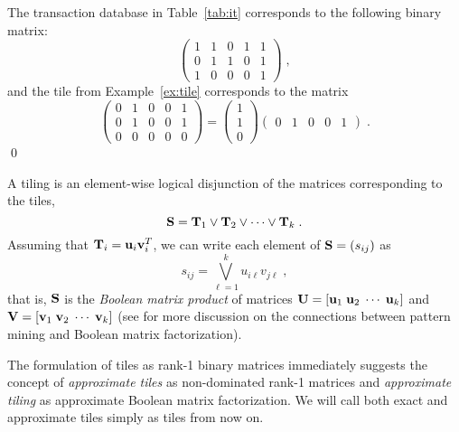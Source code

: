 \begin{example} The transaction database in Table~\ref{tab:it} corresponds to the following binary matrix:
\[
\begin{pmatrix}
    1  & 1 & 0 & 1 & 1 \\
    0  & 1 & 1 & 0 & 1 \\
    1  & 0 & 0 & 0 & 1  
\end{pmatrix}\; ,
\]
and the tile from Example~\ref{ex:tile} corresponds to the matrix
\[
  \begin{pmatrix}
    0  & 1 & 0 & 0 & 1 \\
    0  & 1 & 0 & 0 & 1 \\
    0  & 0 & 0 & 0 & 0  
  \end{pmatrix}
  =
  \begin{pmatrix}
    1 \\
    1 \\
    0
  \end{pmatrix}
  \begin{pmatrix}
    0 & 1 & 0 & 0 & 1
  \end{pmatrix}\; .
\]
\qed
\end{example}

A tiling is an element-wise logical disjunction of the matrices corresponding to the tiles,
\[
  \mathbf{S} = \mathbf{T}_1 \lor \mathbf{T}_2 \lor \cdots \lor \mathbf{T}_k\; .
\]
Assuming that $\mathbf{T}_i = \mathbf{u}_i\mathbf{v}_i^T$, we can write each element of $\mathbf{S}=(s_{ij})$ as
\[
  s_{ij} = \bigvee_{\ell=1}^k u_{i\ell}v_{j\ell}\; ,
\]
that is, $\mathbf{S}$ is the \emph{Boolean matrix product} of matrices $\mathbf{U} = [\mathbf{u}_1\; \mathbf{u}_2\; \cdots \; \mathbf{u}_k]$ and $\mathbf{V} = [\mathbf{v}_1\; \mathbf{v}_2\; \cdots \; \mathbf{v}_k]$ (see \textcite{phd_miettinen} for more discussion on the connections between pattern mining and Boolean matrix factorization).

The formulation of tiles as rank-1 binary matrices immediately suggests the concept of \emph{approximate tiles} as non-dominated rank-1 matrices and \emph{approximate tiling} as approximate Boolean matrix factorization. We will call both exact and approximate tiles simply as tiles from now on.

